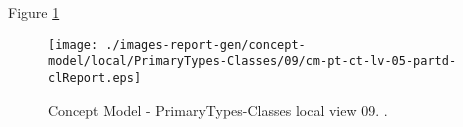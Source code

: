 Figure \ref{fig:ru.iu.bachelor.sed.group01.icrash-CM-view-local-PrimaryTypes-Classes-09} 



\begin{figure}[htbp] 
\label{fig:ru.iu.bachelor.sed.group01.icrash-CM}
\begin{center}
\texttt{[image: ./images-report-gen/concept-model/local/PrimaryTypes-Classes/09/cm-pt-ct-lv-05-partd-clReport.eps]}
\end{center}
\caption[Concept Model - PrimaryTypes-Classes local view 09 - ]{Concept Model - PrimaryTypes-Classes local view 09. .}
\label{fig:ru.iu.bachelor.sed.group01.icrash-CM-view-local-PrimaryTypes-Classes-09}
\end{figure}
\vspace{0.5cm} 
